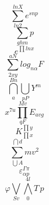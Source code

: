 \begin{equation} \sum^{lnX}_{ln2} e^{snp} \end{equation}
\begin{equation}  \sum_{ghm} p \end{equation}
\begin{equation} e^{\prod ln x} \end{equation}
\begin{equation}  \sum_{2xy}^{aN} log_{n \alpha} F \end{equation}
\begin{equation}  \bigcap_{a}^{Bn} \bigcup_{pP} Y^m \end{equation}
\begin{equation} x^{7u} \prod_{qF}^{Mv} E_{avg} \end{equation}
\begin{equation} K_{\prod x}^{\prod y} \end{equation}
\begin{equation}  \sum_{\bigcup A}^{\bigcap d} mv^2 \end{equation}
\begin{equation}  \varepsilon_{\alpha p}^{\Gamma \pi} \end{equation}
\begin{equation} \varphi \bigvee_{Sv} \bigwedge_0^{4l} T \, p \end{equation}